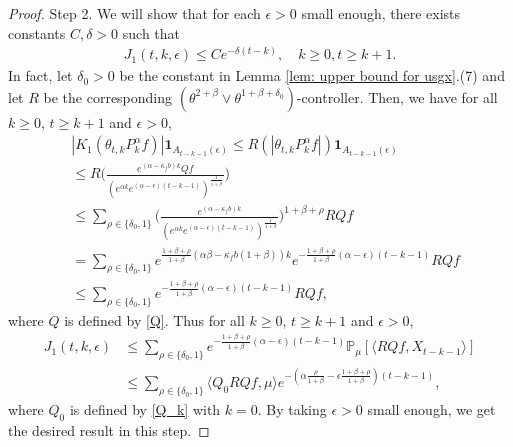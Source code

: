 \documentclass[12pt,a4paper]{amsart}
\theoremstyle{plain}
\theoremstyle{definition}
\numberwithin{equation}{section}
\begin{document}
\begin{proof}
Step 2.  We will show that for each $\epsilon>0$ small enough, there exists constants $C, \delta>0$ such that
    \begin{equation}\begin{split}
    \label{lemma31q}
      J_1(t,k,\epsilon)
      \leq Ce^{-\delta (t-k)},
      \quad k\geq 0, t\geq k+1.
    \end{split}\end{equation}
    In fact, let $\delta_0 >0$ be the constant in Lemma \ref{lem: upper bound for usgx}.(7) and let $R$ be the corresponding $(\theta^{2+\beta}\vee \theta^{1+\beta+\delta_0})$-controller.
    Then, we have for all $k\geq 0$, $t\geq k+1$ and $\epsilon> 0$,
\begin{equation}\begin{split}
   & |K_1(\theta_{t,k}P^\alpha_k f)|\mathbf{1}_{A_{t-k-1}(\epsilon)}
   \leq R(|\theta_{t,k}P^\alpha_k f|)\mathbf{1}_{A_{t-k-1}(\epsilon)}
   \\&\leq R \Big(\frac{e^{(\alpha-\kappa_fb)k} Qf}{(e^{\alpha k}e^{(\alpha-\epsilon)(t-k-1)})^\frac{1}{1+\beta}}\Big)
   \\&\leq \sum_{\rho \in \{\delta_0, 1\}}\Big(\frac{e^{(\alpha-\kappa_fb)k}}{(e^{\alpha k}e^{(\alpha-\epsilon)(t-k-1)})^\frac{1}{1+\beta}}\Big)^{1+\beta+ \rho} RQf
   \\&=\sum_{\rho \in \{\delta_0, 1\}}e^{\frac{1+\beta + \rho}{1+\beta}(\alpha\beta-\kappa_fb(1+\beta))k}e^{-\frac{1+\beta+\rho}{1+\beta} (\alpha-\epsilon)(t-k-1)}RQf
   \\&\leq \sum_{\rho \in \{\delta_0,1\}}e^{-\frac{1+\beta+\rho}{1+\beta}(\alpha-\epsilon)(t-k-1)}RQf,
\end{split}\end{equation}
where $Q$ is defined by \eqref{Q}.
Thus for all $k\geq 0$, $t\geq k+1$ and $\epsilon> 0$,
\begin{equation}\begin{split}
\label{eq: estimate of J1}
     J_1(t,k,\epsilon)&
     \leq \sum_{\rho \in \{\delta_0,1\}}e^{-\frac{1+\beta+\rho}{1+\beta}(\alpha-\epsilon)(t-k-1)}\mathbb{P}_{\mu}[\langle RQf,X_{t-k-1}\rangle]\\
     & \leq \sum_{\rho \in \{\delta_0,1\}} \langle Q_0 RQf, \mu \rangle e^{-(\alpha\frac{\rho}{1+\beta}-\epsilon\frac{1+\beta+\rho}{1+\beta})(t-k-1)},
\end{split}\end{equation}
where $Q_0$ is defined by \eqref{Q_k} with $k=0$.
    By taking $\epsilon>0$ small enough, we get the desired result in this step.


\end{proof}
\end{document}
